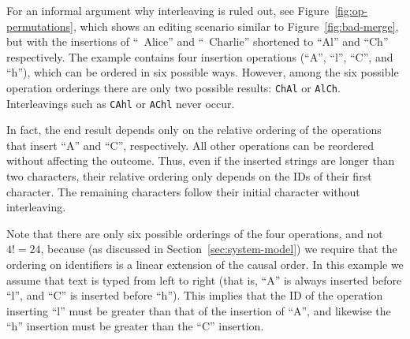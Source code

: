 For an informal argument why interleaving is ruled out, see Figure~\ref{fig:op-permutations}, which shows an editing scenario similar to Figure~\ref{fig:bad-merge}, but with the insertions of ``~Alice'' and ``~Charlie'' shortened to ``Al'' and ``Ch'' respectively.
The example contains four insertion operations (``A'', ``l'', ``C'', and ``h''), which can be ordered in six possible ways.
However, among the six possible operation orderings there are only two possible results: \texttt{ChAl} or \texttt{AlCh}.
Interleavings such as \texttt{CAhl} or \texttt{AChl} never occur.

In fact, the end result depends only on the relative ordering of the operations that insert ``A'' and ``C'', respectively.
All other operations can be reordered without affecting the outcome.
Thus, even if the inserted strings are longer than two characters, their relative ordering only depends on the IDs of their first character.
The remaining characters follow their initial character without interleaving.

Note that there are only six possible orderings of the four operations, and not $4! = 24$, because (as discussed in Section~\ref{sec:system-model}) we require that the ordering on identifiers is a linear extension of the causal order.
In this example we assume that text is typed from left to right (that is, ``A'' is always inserted before ``l'', and ``C'' is inserted before ``h'').
This implies that the ID of the operation inserting ``l'' must be greater than that of the insertion of ``A'', and likewise the ``h'' insertion must be greater than the ``C'' insertion.


